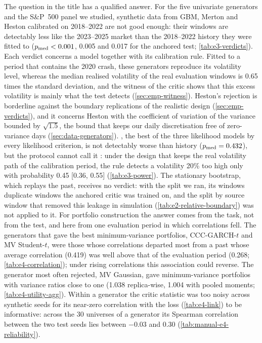The question in the title has a qualified answer. For the five univariate generators and the
S\&P~500 panel we studied, synthetic data from GBM, Merton and Heston calibrated on 2018--2022
are not good enough: their windows are detectably less like the 2023--2025 market than the
2018--2022 history they were fitted to ($p_{\mathrm{med}}<0.001$, 0.005 and 0.017 for the anchored test;
\cref{tab:e3-verdicts}). Each verdict concerns a model together with its calibration rule.
Fitted to a period that contains the 2020 crash, these generators reproduce its volatility level,
whereas the median realised volatility of the real evaluation windows is 0.65 times the \TRAIN{}
standard deviation, and the witness of the critic shows that this excess volatility is mainly
what the test detects (\cref{sec:emp-witness}). Heston's rejection is
borderline against the boundary replications of the realistic design (\cref{sec:emp-verdicts}),
and it concerns Heston with the coefficient of variation of the variance bounded by
$\sqrt{1.5}$, the bound that keeps our daily discretisation free of zero-variance days
(\cref{sec:data-generators}). \GARCHt{}, the best of the three likelihood models by every
likelihood criterion, is not detectably worse than history ($p_{\mathrm{med}}=0.432$), but the protocol
cannot call it \GOOD: under the design that keeps the real volatility path of the calibration
period, the rule detects a volatility 20\% too high only with probability 0.45 [0.36, 0.55]
(\cref{tab:e3-power}). The stationary bootstrap, which replays the past, receives no verdict:
with the split we ran, its windows duplicate windows the anchored critic was trained on, and the
split by source window that removed this leakage in simulation (\cref{tab:e2-relative-boundary})
was not applied to it. For portfolio construction the answer comes from the task, not from the
test, and here from one evaluation period in which correlations fell. The generators that gave
the best minimum-variance portfolios, CCC-GARCH-$t$ and MV Student-$t$, were those whose
correlations departed most from a past whose average correlation (0.419) was well above that of
the evaluation period (0.268; \cref{tab:e4-correlation}); under rising correlations this
association could reverse. The generator most often rejected, MV Gaussian, gave minimum-variance
portfolios with \TEST{} variance ratios close to one (1.038 replica-wise, 1.004 with pooled
moments; \cref{tab:e4-utility-agg}). Within a generator the critic statistic was too noisy across
synthetic seeds for its near-zero correlation with the loss (\cref{tab:e4-link}) to be
informative: across the 30 universes of a generator its Spearman correlation between the two test
seeds lies between $-0.03$ and 0.30 (\cref{tab:manual-e4-reliability}).

